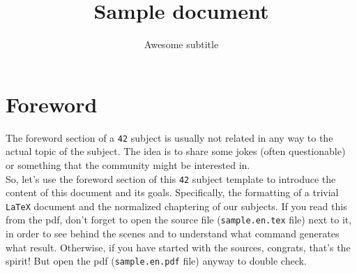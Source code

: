 \documentclass{42-en}
\begin{document}
                           \title{Sample document}
                          \subtitle{Awesome subtitle}

\maketitle

\tableofcontents


\chapter{Foreword}

    The foreword section of a \texttt{42} subject is usually not
    related in any way to the actual topic of the subject. The idea is
    to share some jokes (often questionable) or something that the
    community might be interested in.\\










    So, let's use the foreword section of this \texttt{42} subject
    template to introduce the content of this document and
    its goals. Specifically, the formatting of a trivial
    \texttt{LaTeX} document and the normalized chaptering of our
    subjects. If you read this from the pdf, don't forget to open the
    source file (\texttt{sample.en.tex} file) next to it, in
    order to see behind the scenes and to understand what command
    generates what result. Otherwise, if you have started with the
    sources, congrats, that's the spirit! But open the pdf
    (\texttt{sample.en.pdf} file) anyway to double check.\\
\end{document}
